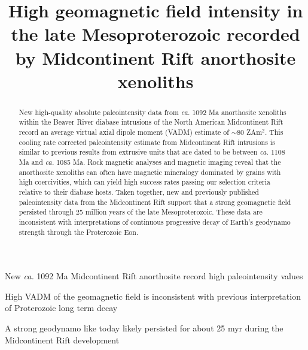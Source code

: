 \documentclass[draft]{agujournal2019}
\begin{document}
\title{High geomagnetic field intensity in the late Mesoproterozoic recorded by Midcontinent Rift anorthosite xenoliths}





\begin{keypoints}
\item New \textit{ca.} 1092 Ma Midcontinent Rift anorthosite record high paleointensity values
\item High VADM of the geomagnetic field is inconsistent with previous interpretation of Proterozoic long term decay
\item A strong geodynamo like today likely persisted for about 25 myr during the Midcontinent Rift development
\end{keypoints}





\begin{abstract}
New high-quality absolute paleointensity data from \textit{ca.} 1092 Ma anorthosite xenoliths within the Beaver River diabase intrusions of the North American Midcontinent Rift record an average virtual axial dipole moment (VADM) estimate of $\sim$80 ZAm$^2$. This cooling rate corrected paleointensity estimate from Midcontinent Rift intrusions is similar to previous results from extrusive units that are dated to be between \textit{ca.} 1108 Ma and \textit{ca.} 1085 Ma. Rock magnetic analyses and magnetic imaging reveal that the anorthosite xenoliths can often have magnetic mineralogy dominated by grains with high coercivities, which can yield high success rates passing our selection criteria relative to their diabase hosts. Taken together, new and previously published paleointensity data from the Midcontinent Rift support that a strong geomagnetic field  persisted through 25 million years of the late Mesoproterozoic. These data are inconsistent with interpretations of continuous progressive decay of Earth's geodynamo strength through the Proterozoic Eon. 


\end{abstract}
\end{document}

